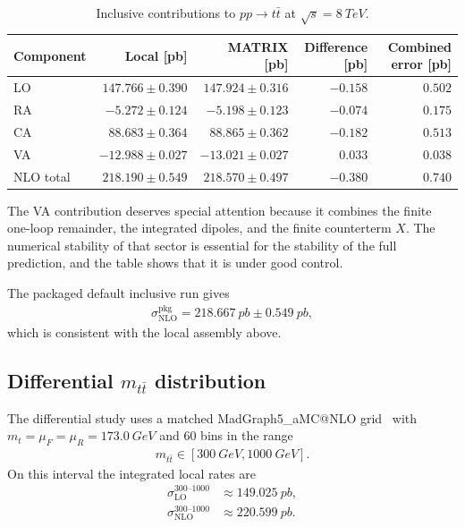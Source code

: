 \documentclass[11pt]{article}
\begin{document}
\begin{table}[H]
\centering
\caption{Inclusive contributions to $pp\to t\bar t$ at $\sqrt{s}=\SI{8}{TeV}$.}
\label{tab:inclusive-components}
\begin{tabular}{lrrrr}
\toprule
Component & Local [pb] & MATRIX [pb] & Difference [pb] & Combined error [pb] \\
\midrule
LO & $147.766 \pm 0.390$ & $147.924 \pm 0.316$ & $-0.158$ & $0.502$ \\
RA & $-5.272 \pm 0.124$ & $-5.198 \pm 0.123$ & $-0.074$ & $0.175$ \\
CA & $88.683 \pm 0.364$ & $88.865 \pm 0.362$ & $-0.182$ & $0.513$ \\
VA & $-12.988 \pm 0.027$ & $-13.021 \pm 0.027$ & $0.033$ & $0.038$ \\
NLO total & $218.190 \pm 0.549$ & $218.570 \pm 0.497$ & $-0.380$ & $0.740$ \\
\bottomrule
\end{tabular}
\end{table}

The VA contribution deserves special attention because it combines the finite one-loop remainder, the integrated dipoles, and the finite counterterm $X$. The numerical stability of that sector is essential for the stability of the full prediction, and the table shows that it is under good control.

The packaged default inclusive run gives
\begin{align}
\sigma_{\text{NLO}}^{\text{pkg}} = \SI{218.667}{pb} \pm \SI{0.549}{pb},
\end{align}
which is consistent with the local assembly above.

\subsection{Differential \texorpdfstring{$m_{t\bar t}$}{mttbar} distribution}

The differential study uses a matched MadGraph5\_aMC@NLO grid~\cite{MG5} with $m_t=\mu_F=\mu_R=\SI{173.0}{GeV}$ and $60$ bins in the range
\begin{align}
m_{t\bar t}\in[\SI{300}{GeV},\SI{1000}{GeV}].
\end{align}
On this interval the integrated local rates are
\begin{align}
\sigma_{\text{LO}}^{300\text{--}1000} &\approx \SI{149.025}{pb}, \\
\sigma_{\text{NLO}}^{300\text{--}1000} &\approx \SI{220.599}{pb}.
\end{align}
\end{document}
